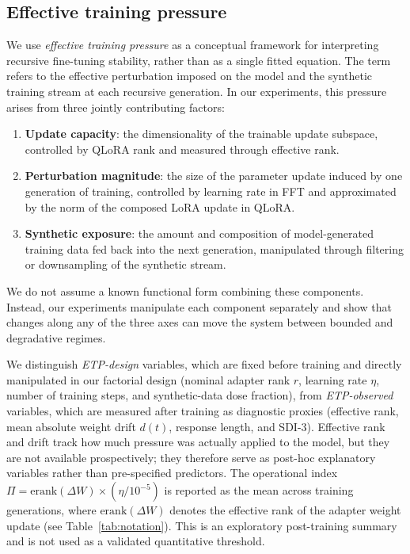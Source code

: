 \documentclass[a4paper,fleqn]{cas-dc}
\newif\ifshowchanges
\newcommand{\rev}[1]{\ifshowchanges{\color{blue}#1}\else{#1}\fi}
\begin{document}
\subsection{Effective training pressure}\label{sec:pressure}

We use \textit{effective training pressure} as a conceptual framework for
interpreting recursive fine-tuning stability, rather than as a single fitted
equation. The term refers to the effective perturbation imposed on the model and
the synthetic training stream at each recursive generation. In our experiments,
this pressure arises from three jointly contributing factors:

\begin{enumerate}
    \item \textbf{Update capacity}: the dimensionality of the trainable update
    subspace, controlled by QLoRA rank and measured through effective rank.

    \item \textbf{Perturbation magnitude}: the size of the parameter update
    induced by one generation of training, controlled by learning rate in FFT and
    approximated by the norm of the composed LoRA update in QLoRA.

    \item \textbf{Synthetic exposure}: the amount and composition of
    model-generated training data fed back into the next generation, manipulated
    through filtering or downsampling of the synthetic stream.
\end{enumerate}

We do not assume a known functional form combining these components. Instead,
our experiments manipulate each component separately and show that changes along
any of the three axes can move the system between bounded and degradative
regimes.

\rev{We distinguish \emph{ETP-design} variables, which are fixed before training and
directly manipulated in our factorial design (nominal adapter rank $r$, learning
rate $\eta$, number of training steps, and synthetic-data dose fraction), from
\emph{ETP-observed} variables, which are measured after training as diagnostic
proxies (effective rank, mean absolute weight drift $d(t)$, response length, and
SDI-3). Effective rank and drift track how much pressure was actually applied to
the model, but they are not available prospectively; they therefore serve as
post-hoc explanatory variables rather than pre-specified predictors. The
operational index $\Pi = \mathrm{erank}(\Delta W) \times (\eta / 10^{-5})$ is reported as the mean across training generations, where $\mathrm{erank}(\Delta W)$ denotes the effective rank of the adapter weight update (see Table~\ref{tab:notation}). This is
an exploratory post-training summary and is not used as a validated quantitative
threshold.}
\end{document}
